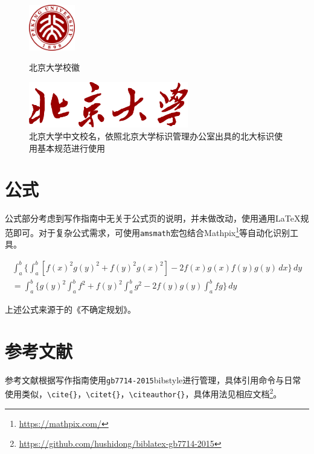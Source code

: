 \begin{figure}[htb]
\begin{minipage}{0.48\textwidth}
  \centering
  \includegraphics[height=2cm]{img/pku-fig-logo}
  \caption{北京大学校徽}
  \label{fig:example-fig-abreast-1}
\end{minipage}\hfill
\begin{minipage}{0.48\textwidth}
  \centering
  \includegraphics[height=2cm]{img/pku-text-logo}
  \caption{北京大学中文校名，依照北京大学标识管理办公室出具的北大标识使用基本规范进行使用}
  \label{fig:example-fig-abreast-2}
\end{minipage}
\end{figure}

\section{公式}
\label{sec:equation}

公式部分考虑到写作指南中无关于公式页的说明，并未做改动，使用通用\LaTeX{}规范即可。对于复杂公式需求，可使用\verb|amsmath|宏包结合Mathpix\footnote{\url{https://mathpix.com/}}等自动化识别工具。

\begin{multline*}
\int_a^b\biggl\{\int_a^b[f(x)^2g(y)^2+f(y)^2g(x)^2]
 -2f(x)g(x)f(y)g(y)\,dx\biggr\}\,dy \\
 =\int_a^b\biggl\{g(y)^2\int_a^bf^2+f(y)^2
  \int_a^b g^2-2f(y)g(y)\int_a^b fg\biggr\}\,dy
\end{multline*}

上述公式来源于\citeauthor{liu2003uncertain}的《不确定规划》\citet{liu2003uncertain}。

\section{参考文献}
\label{sec:bibtex}

参考文献根据写作指南使用\verb|gb7714-2015|bibstyle进行管理，具体引用命令与日常使用类似，\verb|\cite{}|，\verb|\citet{}|，\verb|\citeauthor{}|，具体用法见相应文档\footnote{\url{https://github.com/hushidong/biblatex-gb7714-2015}}。

